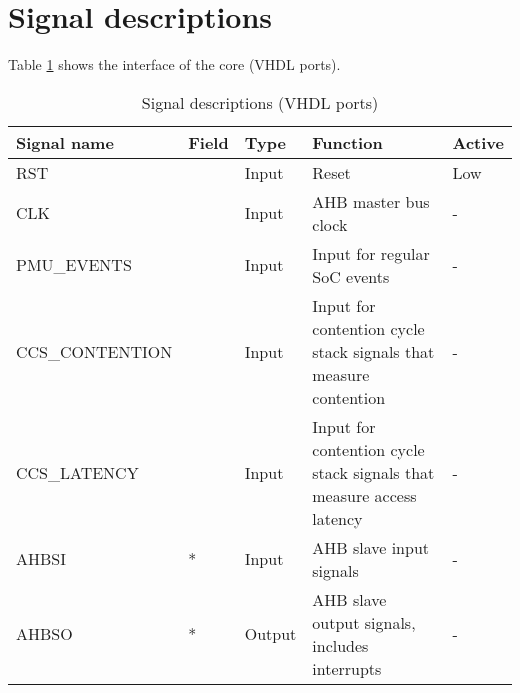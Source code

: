\section{Signal descriptions}
Table \ref{t_ports} shows the interface of the core (VHDL ports).
\begin{table}[H]
	\caption{Signal descriptions (VHDL ports)}
	\label{t_ports}
	\centering
	\begin{footnotesize}
	\begin{tabular}{|l|l|l|l|l|}
		\hline
		\textbf{Signal name} & \textbf{Field}  & \textbf{Type}  & \textbf{Function} & \textbf{Active}\\
		\hline
		RST & &Input &Reset & Low\\
		\hline
		CLK & &Input &AHB master bus clock & -\\
		\hline
		PMU\_EVENTS & &Input & Input for regular SoC events & -\\
		\hline
		CCS\_CONTENTION & &Input & Input for contention cycle stack signals that measure contention  & -\\
		\hline
		CCS\_LATENCY & &Input & Input for contention cycle stack signals that measure access latency & -\\
		\hline
		AHBSI & * &Input & AHB slave input signals& -\\
		\hline
		AHBSO & * &Output &AHB slave output signals, includes interrupts & - \\
		\hline
	\end{tabular}
\end{footnotesize}
\end{table}



